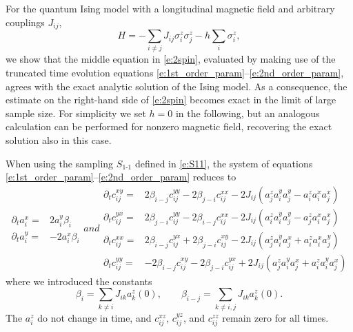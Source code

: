 \documentclass[aps,prl,showpacs,amsmath,amssymb,superscriptaddress,reprint,10pt]{revtex4-1}
\begin{document}
\begin{bibunit}
For the quantum Ising model with a longitudinal magnetic field and arbitrary couplings $J_{ij}$,
\begin{equation}
H=-\sum_{i\neq j}J_{ij}\sigma_i^z\sigma_j^z - h\sum_i\sigma_i^z,
\end{equation}
we show that the middle equation in \eqref{e:2spin}, evaluated by making use of the truncated time evolution equations \eqref{e:1st_order_param}--\eqref{e:2nd_order_param}, agrees with the exact analytic solution of the Ising model. As a consequence, the estimate on the right-hand side of \eqref{e:2spin} becomes exact in the limit of large sample size.
For simplicity we set $h=0$ in the following, but an analogous calculation can be performed for nonzero magnetic field, recovering the exact solution also in this case.

When using the sampling $S_{\text{1-1}}$ defined in \eqref{e:S11}, the system of equations \eqref{e:1st_order_param}--\eqref{e:2nd_order_param} reduces to
\begin{subequations}
\begin{equation}
\begin{split}
 \partial_t a_i^x=&2a_i^y\beta_i\\
 \partial_t a_i^y=&-2a_i^x\beta_i
\end{split}
\end{equation}
and
\begin{equation}\label{corr_Ising}
\begin{split}
 \partial_t c_{ij}^{xy}=&2\beta_{i-j}c_{ij}^{yy}-2\beta_{j-i}c_{ij}^{xx}-2J_{ij}(a_j^za_i^ya_j^y-a_i^za_i^xa_j^x)\\
 \partial_t c_{ij}^{yx}=&2\beta_{j-i}c_{ij}^{yy}-2\beta_{i-j}c_{ij}^{xx}-2J_{ij}(a_i^za_i^ya_j^y-a_j^za_i^xa_j^x)\\
 \partial_t c_{ij}^{xx}=&2\beta_{i-j}c_{ij}^{yx}+2\beta_{j-i}c_{ij}^{xy}-2J_{ij}(a_j^za_i^ya_j^x+a_i^za_i^xa_j^y)\\
 \partial_t c_{ij}^{yy}=&-2\beta_{i-j}c_{ij}^{xy}-2\beta_{j-i}c_{ij}^{yx}+2J_{ij}(a_j^za_i^ya_j^x+a_i^za_i^ya_j^x)
\end{split}
\end{equation}
\end{subequations}
where we introduced the constants
\begin{equation}
\beta_{i}=\sum_{k\neq i} J_{ik} a_k^z(0),\qquad \beta_{i-j}=\sum_{k\neq i,j} J_{ik} a_k^z(0).
\end{equation}
The $a_i^z$ do not change in time, and $c_{ij}^{xz}$, $c_{ij}^{yz}$, and $c_{ij}^{zz}$ remain zero for all times.

\end{bibunit}
\end{document}
